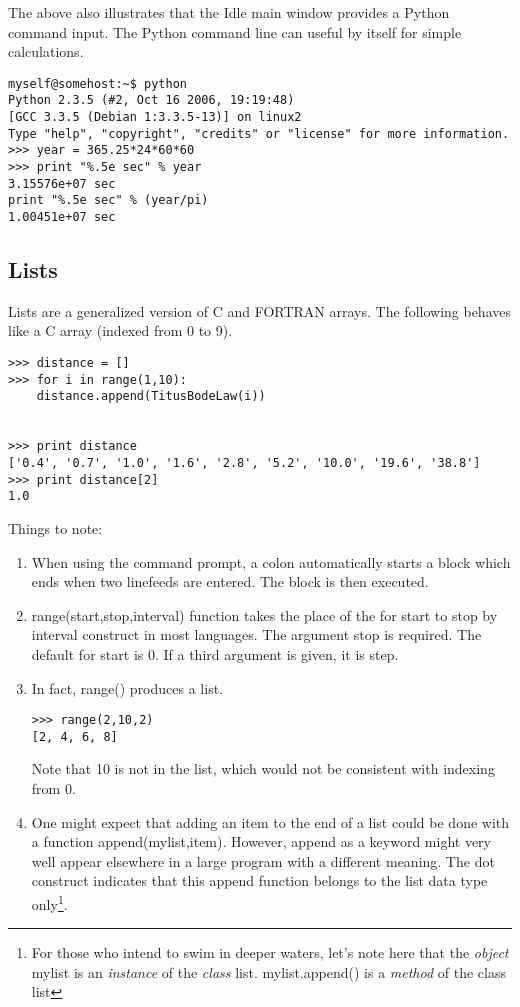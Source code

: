\documentclass{article}
\begin{document}
The above also illustrates that the Idle main window provides a Python command input.
The Python command line can useful by itself for simple calculations.
\begin{verbatim}
myself@somehost:~$ python
Python 2.3.5 (#2, Oct 16 2006, 19:19:48)
[GCC 3.3.5 (Debian 1:3.3.5-13)] on linux2
Type "help", "copyright", "credits" or "license" for more information.
>>> year = 365.25*24*60*60
>>> print "%.5e sec" % year
3.15576e+07 sec
print "%.5e sec" % (year/pi)
1.00451e+07 sec
\end{verbatim}

\subsection{Lists}

Lists are a generalized version of C and FORTRAN arrays. The following behaves like
a C array (indexed from 0 to 9).
\begin{verbatim}
>>> distance = []
>>> for i in range(1,10):
	distance.append(TitusBodeLaw(i))

	
>>> print distance
['0.4', '0.7', '1.0', '1.6', '2.8', '5.2', '10.0', '19.6', '38.8']
>>> print distance[2]
1.0
\end{verbatim}
Things to note:
\begin{enumerate}
\item When using the command prompt, a colon automatically starts a block
which ends when two linefeeds are entered. The block is then executed.
\item {\ttfamily range(start,stop,interval)} function takes the place of the
{\ttfamily for start to stop by interval} construct in most languages.
The argument {\ttfamily stop} is required. The default for {\ttfamily start}
is 0. If a third argument is given, it is {\ttfamily step}.
\item In fact, {\ttfamily range()} produces a list.
\begin{verbatim}
>>> range(2,10,2)
[2, 4, 6, 8]
\end{verbatim}
Note that 10 is not in the list, which would not be consistent with indexing
from 0.
\item One might expect that adding an item to the end of a list could be
done with a function {\ttfamily append(mylist,item)}.  However, {\ttfamily
append} as a keyword might very well appear elsewhere in a large program with
a different
meaning.  The dot construct indicates that this {\ttfamily append} function
belongs to the list data type only\footnote{For those who intend to swim in
deeper waters, let's note here that
the {\itshape object} {\ttfamily mylist} is an {\itshape instance} of the
{\itshape class} {\ttfamily list}. {\ttfamily mylist.append()} is a {\itshape
method} of the class {\ttfamily list}}.
\end{enumerate}
\end{document}
